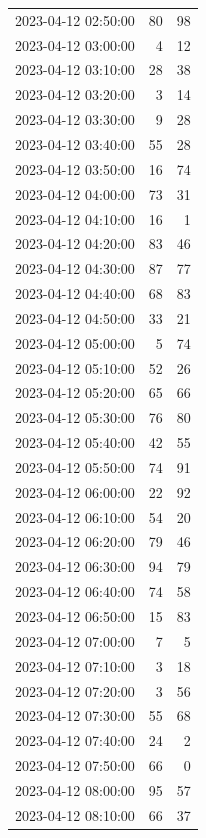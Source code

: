 \documentclass[
  letterpaper,
  DIV=11,
  numbers=noendperiod]{scrartcl}
\begin{document}
\begin{tabular}{lrr}
2023-04-12 02:50:00 &    80 &    98 \\
2023-04-12 03:00:00 &     4 &    12 \\
2023-04-12 03:10:00 &    28 &    38 \\
2023-04-12 03:20:00 &     3 &    14 \\
2023-04-12 03:30:00 &     9 &    28 \\
2023-04-12 03:40:00 &    55 &    28 \\
2023-04-12 03:50:00 &    16 &    74 \\
2023-04-12 04:00:00 &    73 &    31 \\
2023-04-12 04:10:00 &    16 &     1 \\
2023-04-12 04:20:00 &    83 &    46 \\
2023-04-12 04:30:00 &    87 &    77 \\
2023-04-12 04:40:00 &    68 &    83 \\
2023-04-12 04:50:00 &    33 &    21 \\
2023-04-12 05:00:00 &     5 &    74 \\
2023-04-12 05:10:00 &    52 &    26 \\
2023-04-12 05:20:00 &    65 &    66 \\
2023-04-12 05:30:00 &    76 &    80 \\
2023-04-12 05:40:00 &    42 &    55 \\
2023-04-12 05:50:00 &    74 &    91 \\
2023-04-12 06:00:00 &    22 &    92 \\
2023-04-12 06:10:00 &    54 &    20 \\
2023-04-12 06:20:00 &    79 &    46 \\
2023-04-12 06:30:00 &    94 &    79 \\
2023-04-12 06:40:00 &    74 &    58 \\
2023-04-12 06:50:00 &    15 &    83 \\
2023-04-12 07:00:00 &     7 &     5 \\
2023-04-12 07:10:00 &     3 &    18 \\
2023-04-12 07:20:00 &     3 &    56 \\
2023-04-12 07:30:00 &    55 &    68 \\
2023-04-12 07:40:00 &    24 &     2 \\
2023-04-12 07:50:00 &    66 &     0 \\
2023-04-12 08:00:00 &    95 &    57 \\
2023-04-12 08:10:00 &    66 &    37 \\

\end{tabular}
\end{document}
